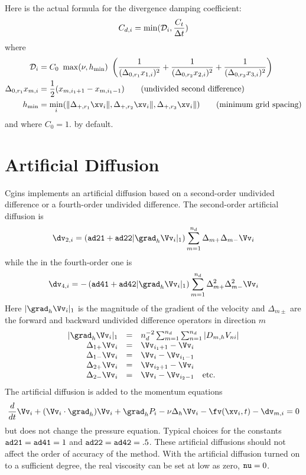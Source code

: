 \documentclass[12pt]{article}
\begin{document}
Here is the actual formula for the divergence damping coefficient:
\[ 
   C_{d,i} = \min( {\cal D}_i , {C_t \over \Delta t} )
\]
where
\begin{align*}
  {\cal D}_i &=   C_0~ \max( \nu, h_{\rm min} ) ~\left(
        {1\over (\Delta_{0,r_1} x_{1,i})^{2}} +
        {1\over (\Delta_{0,r_2} x_{2,i})^{2}} +
        {1\over (\Delta_{0,r_3} x_{3,i})^{2}} \right)   \\
  \Delta_{0,r_1} x_{m,i} &=  {1\over2} ( x_{m,i_1+1} - x_{m,i_1-1} ) \qquad \mbox{(undivided second difference)}\\
  h_{\rm min} &= \min_i ( \| \Delta_{+,r_1} \xv_i \|, \Delta_{+,r_2} \xv_i \|, \Delta_{+,r_3} \xv_i \| ) 
        \qquad \mbox{(minimum grid spacing)} \\
\end{align*}
and where $C_0=1.$ by default.

\section{Artificial Diffusion} \label{AD}

Cgins implements an
artificial diffusion based on a second-order undivided
difference or a fourth-order undivided difference.
The second-order artificial diffusion is
\begin{equation} \label{AD2}
   \dv_{2,i} =
    \left( {\ff ad21} + {\ff ad22} | \grad_h \Vv_i |_1
    \right) \sum_{m=1}^{n_d} \Delta_{m+}\Delta_{m-} \Vv_i
\end{equation}
while the in the fourth-order one is
\begin{equation} \label{AD4}
   \dv_{4,i} =
  - \left( {\ff ad41} + {\ff ad42} | \grad_h \Vv_i |_1
    \right) \sum_{m=1}^{n_d} \Delta_{m+}^2\Delta_{m-}^2 \Vv_i
\end{equation}
Here $|\grad_h \Vv_i |_1$ is the magnitude of the
gradient of the velocity and $\Delta_{m\pm}$ are the forward and backward
undivided difference operators in direction $m$
$$
\begin{array}{rcl}
  | \grad_h \Vv_i |_1 &=& n_d^{-2}
          \sum_{m=1}^{n_d} \sum_{n=1}^{n_d} | D_{m,h} V_{n i} | \\
  \Delta_{1+}\Vv_i &=& \Vv_{i_1+1} - \Vv_i \\
  \Delta_{1-}\Vv_i &=& \Vv_i - \Vv_{i_1-1}   \\
  \Delta_{2+}\Vv_i &=& \Vv_{i_2+1} - \Vv_i \\
  \Delta_{2-}\Vv_i &=& \Vv_i - \Vv_{i_2-1}  ~~~\mbox{etc.} \\
\end{array}
$$
The artificial diffusion is added to the momentum equations
$$
  {d\over dt} \Vv_i + (\Vv_i\cdot\grad_h)\Vv_i + \grad_h \pd_i
       - \nu \Delta_h \Vv_i -\fv(\xv_i,t) - \dv_{m,i}  = 0
$$
but does not change the pressure equation.  Typical choices for the
constants ${\tt ad21}={\tt ad41}=1$ and ${\tt ad22}={\tt
ad42}=.5$. These artificial diffusions should not affect the order of
accuracy of the method.  With the artificial diffusion turned on to a
sufficient degree, the real viscosity can be set at low as zero, ${\tt
nu}=0$.  
\end{document}
